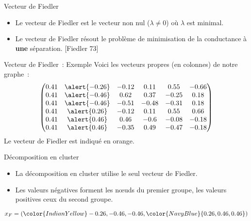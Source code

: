 \begin{frame}{Vecteur de Fiedler}
    \begin{itemize}
        \item Le \alert{vecteur de Fiedler} est le vecteur non nul ($\lambda \neq 0$) où $\lambda$ est minimal. 
        \item Le vecteur de Fiedler résout le problème de minimisation de la conductance à \textbf{une} séparation. [Fiedler 73]
    \end{itemize} 
\end{frame}
 
\begin{frame}{Vecteur de Fiedler~: Exemple}
    Voici les vecteurs propres (en colonnes) de notre graphe~:
    {\footnotesize
    $$
    \begin{pmatrix}
        0.41& \alert{-0.26}& -0.12&  0.11&  0.55& -0.66\\
        0.41& \alert{-0.46}&  0.62&  0.37& -0.25&  0.18\\
        0.41& \alert{-0.46}& -0.51& -0.48& -0.31&  0.18\\
        0.41&  \alert{0.26}& -0.12&  0.11&  0.55&  0.66\\
        0.41&  \alert{0.46}&  0.46& -0.6 & -0.08& -0.18\\
        0.41&  \alert{0.46}& -0.35&  0.49& -0.47& -0.18\\
    \end{pmatrix}
    $$}
    Le vecteur de Fiedler est indiqué en \alert{orange}.

\end{frame}

\begin{frame}{Décomposition en cluster}
    \begin{minipage}{0.64\linewidth}
        \begin{itemize}
            \item La décomposition en cluster utilise le seul vecteur de Fiedler.
            \item Les valeurs négatives forment les nœuds du premier groupe, les valeurs positives ceux du second groupe.
        \end{itemize}
        $x_F = ({\color{IndianYellow}-0.26, -0.46, -0.46}, {\color{NavyBlue}{0.26, 0.46, 0.46}})$
    \end{minipage}
    \begin{minipage}{0.34\linewidth}
    \end{minipage}
\end{frame}

